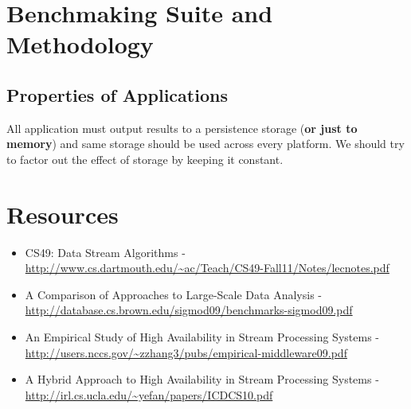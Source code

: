 \documentclass{sig-alternate}
\begin{document}
\section{Benchmaking Suite and Methodology}

\subsection{Properties of Applications}

All application must output results to a persistence storage (\textbf{or just to memory}) and same
storage should be used across every platform. We should try to factor out the effect of storage by
keeping it constant.

\section{Resources}

\begin{itemize}
 \item CS49: Data Stream Algorithms - \url{http://www.cs.dartmouth.edu/~ac/Teach/CS49-Fall11/Notes/lecnotes.pdf}
 \item A Comparison of Approaches to Large-Scale Data Analysis - \url{http://database.cs.brown.edu/sigmod09/benchmarks-sigmod09.pdf}
 \item An Empirical Study of High Availability in Stream Processing Systems - \url{http://users.nccs.gov/~zzhang3/pubs/empirical-middleware09.pdf}
   \item A Hybrid Approach to High Availability in Stream Processing Systems - \url{http://irl.cs.ucla.edu/~yefan/papers/ICDCS10.pdf}
\end{itemize}



\end{document}
